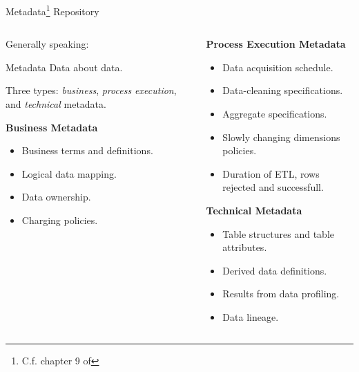 \begin{frame}{Metadata\footnote{C.f. chapter 9 of } Repository}
	\begin{columns}
		\begin{column}{0.5\textwidth}
			Generally speaking:

			\begin{block}{Metadata}
				Data about data.
			\end{block}

			Three types: \textit{business}, \textit{process execution}, and
			\textit{technical} metadata.

			\vspace*{0.8em}
			\textbf{Business Metadata}
			\begin{itemize}
				\item Business terms and definitions.
				\item Logical data mapping.
				\item Data ownership.
				\item Charging policies.
			\end{itemize}
		\end{column}

		\begin{column}{0.5\textwidth}
			\textbf{Process Execution Metadata}
			\begin{itemize}
				\item Data acquisition schedule.
				\item Data-cleaning specifications.
				\item Aggregate specifications.
				\item Slowly changing dimensions policies.
				\item Duration of ETL, rows rejected and successfull.
			\end{itemize}
			\textbf{Technical Metadata}
			\begin{itemize}
				\item Table structures and table attributes.
				\item Derived data definitions.
				\item Results from data profiling.
				\item Data lineage.
			\end{itemize}

		\end{column}
	\end{columns}
\end{frame}

